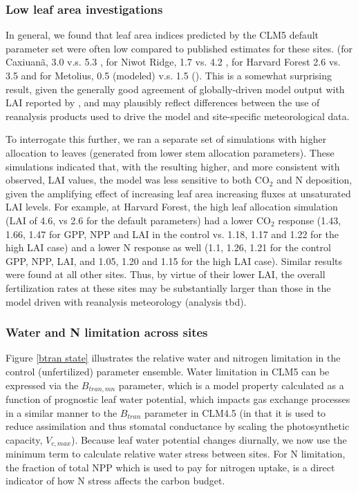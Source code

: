 \documentclass[draft,linenumbers]{agujournal}
\begin{document}
\subsubsection{Low leaf area investigations}
In general, we found that leaf area indices predicted by the CLM5 default parameter set were often low  compared to published estimates for these sites. (for Caxiuan\~a, 3.0 v.s. 5.3 \cite{fisher2007}, for Niwot Ridge, 1.7 vs. 4.2 \cite{bowling2009}, for Harvard Forest 2.6 vs. 3.5 \cite{williams1996} and for Metolius, 0.5 (modeled) v.s. 1.5 (\cite{spadavecchia2011}). This is a somewhat surprising result, given the generally good agreement of globally-driven model output with LAI reported by \cite{lawrence2018}, and may plausibly reflect differences between the use of reanalysis products used to drive the model and site-specific meteorological data. 

To interrogate this further, we ran a separate set of simulations with higher allocation to leaves (generated from lower stem allocation parameters). These simulations indicated that, with the resulting higher, and more consistent with observed, LAI values, the model was less sensitive to both CO$_{2}$ and N deposition, given the amplifying effect of increasing leaf area increasing fluxes at unsaturated LAI levels.   For example, at Harvard Forest, the high leaf allocation  simulation (LAI of 4.6, vs 2.6 for the default parameters) had a lower CO$_{2}$ response (1.43, 1.66, 1.47 for GPP, NPP and LAI in the control vs. 1.18, 1.17 and 1.22 for the high LAI case) and a lower N response as well (1.1, 1.26, 1.21 for the control GPP, NPP, LAI, and 1.05, 1.20 and 1.15 for the high LAI case). Similar results were found at all other sites.  Thus, by virtue of their lower LAI, the overall fertilization rates at these sites may be substantially larger than those in the model driven with reanalysis meteorology (analysis tbd). 

\subsubsection{Water and N limitation across sites}
Figure \ref{btran state} illustrates the relative water and nitrogen limitation in the control (unfertilized) parameter ensemble. Water limitation in CLM5 can be expressed via the $B_{tran,mn}$ parameter, which is a model property calculated as a function of prognostic leaf water potential, which impacts gas exchange processes in a similar manner to the $B_{tran}$ parameter in CLM4.5 (in that it is used to reduce assimilation and thus stomatal conductance by scaling the photosynthetic capacity, $V_{c,max}$). Because leaf water potential changes diurnally, we now use the minimum term to calculate relative water stress between sites. For N limitation, the fraction of total NPP which is used to pay for nitrogen uptake, is a direct indicator of how N stress affects the carbon budget.  
\end{document}
